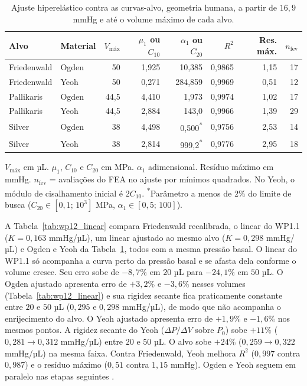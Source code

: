  
\begin{table}[h]
\centering
\small
\caption{Ajuste hiperelástico contra as curvas-alvo, geometria humana, a partir de $16{,}9$ mmHg e até o volume máximo de cada alvo.}
\label{tab:wp12_ajuste}
\begin{tabular}{@{}llrrrrrr@{}}
\toprule
Alvo & Material & $V_{\text{máx}}$ & $\mu_1$ ou $C_{10}$ & $\alpha_1$ ou $C_{20}$ & $R^2$ & Res. máx. & $n_{\text{fev}}$ \\
\midrule
Friedenwald & Ogden & 50 & 1,925 & 10,385           & 0,9865 & 1,15 & 17 \\
Friedenwald & Yeoh  & 50 & 0,271 & 284,859          & 0,9969 & 0,51 & 12 \\
Pallikaris  & Ogden & 44,5 & 4,410 & 1,973            & 0,9974 & 1,02 & 17 \\
Pallikaris  & Yeoh  & 44,5 & 2,884 & 143,0            & 0,9966 & 1,39 & 29 \\
Silver      & Ogden & 38 & 4,498 & 0,500\textsuperscript{*} & 0,9756 & 2,53 & 14 \\
Silver      & Yeoh  & 38 & 2,814 & 999,2\textsuperscript{*} & 0,9776 & 2,95 & 18 \\
\bottomrule
\end{tabular}
 
\vspace{2pt}
\footnotesize $V_{\text{máx}}$ em µL. $\mu_1$, $C_{10}$ e $C_{20}$ em MPa. $\alpha_1$ adimensional. Resíduo máximo em mmHg. $n_{\text{fev}}$ = avaliações do FEA no ajuste por mínimos quadrados. No Yeoh, o módulo de cisalhamento inicial é $2C_{10}$. \textsuperscript{*}Parâmetro a menos de $2\%$ do limite de busca ($C_{20}\in[0{,}1;\,10^{3}]$ MPa, $\alpha_1\in[0{,}5;\,100]$).
\end{table}

A Tabela~\ref{tab:wp12_linear} compara Friedenwald recalibrada, o linear do WP1.1 ($K=0{,}163$ mmHg/µL), um linear ajustado ao mesmo alvo ($K=0{,}298$ mmHg/µL) e Ogden e Yeoh da Tabela~\ref{tab:wp12_ajuste}, todos com a mesma pressão basal. O linear do WP1.1 só acompanha a curva perto da pressão basal e se afasta dela conforme o volume cresce. Seu erro sobe de $-8{,}7\%$ em $20$ µL para $-24{,}1\%$ em $50$ µL. O Ogden ajustado apresenta erro de $+3{,}2\%$ e $-3{,}6\%$ nesses volumes (Tabela~\ref{tab:wp12_linear}) e sua rigidez secante fica praticamente constante entre $20$ e $50$ µL ($0{,}295$ e $0{,}298$ mmHg/µL), de modo que não acompanha o enrijecimento do alvo. O Yeoh ajustado apresenta erro de $+1{,}9\%$ e $-1{,}6\%$ nos mesmos pontos. A rigidez secante do Yeoh ($\Delta P/\Delta V$ sobre $P_0$) sobe $+11\%$ ($0{,}281\to0{,}312$ mmHg/µL) entre $20$ e $50$ µL. O alvo sobe $+24\%$ ($0{,}259\to0{,}322$ mmHg/µL) na mesma faixa. Contra Friedenwald, Yeoh melhora $R^2$ ($0{,}997$ contra $0{,}987$) e o resíduo máximo ($0{,}51$ contra $1{,}15$ mmHg). Ogden e Yeoh seguem em paralelo nas etapas seguintes \citep{ogden1972large,yeoh1993some}.

